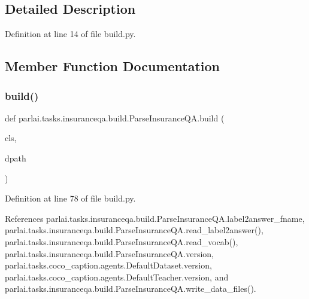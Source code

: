 \subsection{Detailed Description}


Definition at line 14 of file build.\+py.



\subsection{Member Function Documentation}
\mbox{\label{classparlai_1_1tasks_1_1insuranceqa_1_1build_1_1ParseInsuranceQA_a94f69218557d222da922e0de7f41f75a}} 
\subsubsection{\texorpdfstring{build()}{build()}}
{\footnotesize\ttfamily def parlai.\+tasks.\+insuranceqa.\+build.\+Parse\+Insurance\+Q\+A.\+build (\begin{DoxyParamCaption}\item[{}]{cls,  }\item[{}]{dpath }\end{DoxyParamCaption})}



Definition at line 78 of file build.\+py.



References parlai.\+tasks.\+insuranceqa.\+build.\+Parse\+Insurance\+Q\+A.\+label2answer\+\_\+fname, parlai.\+tasks.\+insuranceqa.\+build.\+Parse\+Insurance\+Q\+A.\+read\+\_\+label2answer(), parlai.\+tasks.\+insuranceqa.\+build.\+Parse\+Insurance\+Q\+A.\+read\+\_\+vocab(), parlai.\+tasks.\+insuranceqa.\+build.\+Parse\+Insurance\+Q\+A.\+version, parlai.\+tasks.\+coco\+\_\+caption.\+agents.\+Default\+Dataset.\+version, parlai.\+tasks.\+coco\+\_\+caption.\+agents.\+Default\+Teacher.\+version, and parlai.\+tasks.\+insuranceqa.\+build.\+Parse\+Insurance\+Q\+A.\+write\+\_\+data\+\_\+files().

